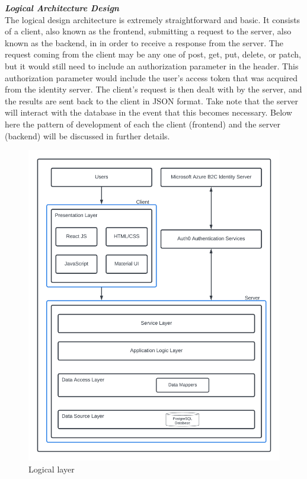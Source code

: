 \begin{justify}
\newendline \textbf{\textit{Logical Architecture Design}}\\
The logical design architecture is extremely straightforward and basic. It consists of a client, also known as the frontend, submitting a request to the server, also known as the backend, in in order to receive a response from the server. The request coming from the client may be any one of post, get, put, delete, or patch, but it would still need to include an authorization parameter in the header. This authorization parameter would include the user's access token that was acquired from the identity server. The client's request is then dealt with by the server, and the results are sent back to the client in JSON format. Take note that the server will interact with the database in the event that this becomes necessary. Below here the pattern of development of each the client (frontend) and the server (backend) will be discussed in further details.

\begin{figure}[H]
    \centerline{\includegraphics[width=150mm,scale=1]{figures/analysis_and_design/design/Logical Layer V2.png}}
    \caption{Logical layer}
    \label{LogicalLayer}
\end{figure}


\end{justify}

